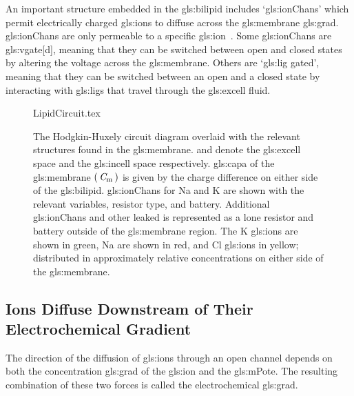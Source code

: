 \documentclass[class={myRUCProject}, crop=false]{standalone}
\begin{document}
An important structure embedded in the \gls{gls:bilipid} includes `\glspl{gls:ionChan}' which permit electrically charged \glspl{gls:ion} to diffuse across the \gls{gls:membrane} \gls{gls:grad}. \Glspl{gls:ionChan} are only permeable to a specific \gls{gls:ion}~\cite{Hammond2015ch4}. Some \glspl{gls:ionChan} are \gls{gls:vgate}[d], meaning that they can be switched between open and closed states by altering the voltage across the \gls{gls:membrane}. 
Others are `\gls{gls:lig} gated', meaning that they can be switched between an open and a closed state by interacting with \glspl{gls:lig} that travel through the \gls{gls:excell} fluid. 

\vspace{1em}

\begin{figure}[H]
    \centering
    {LipidCircuit.tex}
    \caption{The Hodgkin-Huxely circuit diagram overlaid with the relevant structures found in the \gls{gls:membrane}.  and  denote the \gls{gls:excell} space and the \gls{gls:incell} space respectively. \Gls{gls:capa} of the \gls{gls:membrane} \(\left(\,\mathit{C}_\mathrm{m}\,\right)\) is given by the charge difference on either side of the \gls{gls:bilipid}. \Glspl{gls:ionChan} for  \gls{Na} and  \gls{K} are shown with the relevant variables, resistor type, and battery. Additional \glspl{gls:ionChan} and other leaked is represented as a lone resistor and battery outside of the \gls{gls:membrane} region. The \gls{K} \glspl{gls:ion} are shown in green,  \gls{Na} are shown in red, and  \gls{Cl} \glspl{gls:ion} in yellow; distributed in approximately relative concentrations on either side of the \gls{gls:membrane}. }\label{fig:MembraneCircut}
\end{figure}


\subsection{Ions Diffuse Downstream of Their Electrochemical Gradient}\label{sec:diffuseIon}


The direction of the diffusion of \glspl{gls:ion} through an open channel depends on both the concentration \gls{gls:grad} of the \gls{gls:ion} and the \gls{gls:mPote}. The resulting combination of these two forces is called the electrochemical \gls{gls:grad}.
\end{document}
